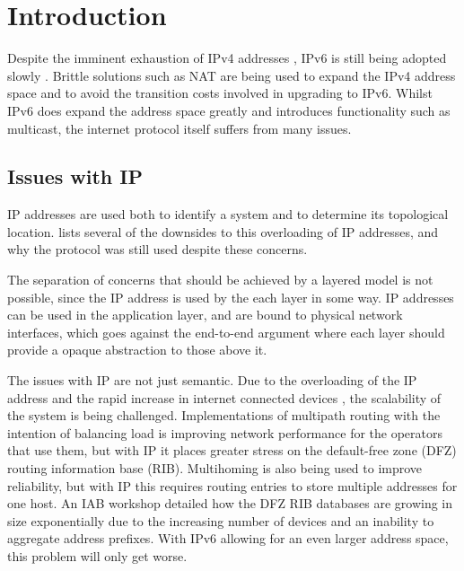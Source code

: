 \documentclass[12pt]{article}
\begin{document}
\newpage

\tableofcontents

\newpage
{}
\setcounter{page}{1} 

\section{Introduction}

Despite the imminent exhaustion of IPv4 addresses \cite{ripe_labs}, IPv6 is still being adopted slowly \cite{google_ipv6}. Brittle solutions such as NAT are being used to expand the IPv4 address space and to avoid the transition costs involved in upgrading to IPv6. Whilst IPv6 does expand the address space greatly and introduces functionality such as multicast, the internet protocol itself suffers from many issues. 

\subsection{Issues with IP}

IP addresses are used both to identify a system and to determine its topological location. \cite{briancarpenter2014} lists several of the downsides to this overloading of IP addresses, and why the protocol was still used despite these concerns. 

The separation of concerns that should be achieved by a layered model is not possible, since the IP address is used by the each layer in some way. IP addresses can be used in the application layer, and are bound to physical network interfaces, which goes against the end-to-end argument where each layer should provide a opaque abstraction to those above it.

The issues with IP are not just semantic. Due to the overloading of the IP address and the rapid increase in internet connected devices \cite{iot_stat}, the scalability of the system is being challenged. Implementations of multipath routing with the intention of balancing load is improving network performance for the operators that use them, but with IP it places greater stress on the default-free zone (DFZ) routing information base (RIB). Multihoming is also being used to improve reliability, but with IP this requires routing entries to store multiple addresses for one host. An IAB workshop \cite{rfc4984} detailed how the DFZ RIB databases are growing in size exponentially due to the increasing number of devices and an inability to aggregate address prefixes. With IPv6 allowing for an even larger address space, this problem will only get worse. 
\end{document}
